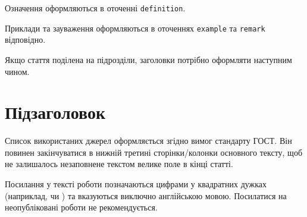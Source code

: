 \documentclass{KnuBulletin}
\begin{document}
\begin{multicols}{2}
    \begin{definition}
	   	Означення оформляються в оточенні \texttt{definition}.
	\end{definition}	
    

	\begin{remark}
		Приклади та зауваження оформляються в оточеннях 
		\texttt{example} та \texttt{remark} відповідно.
	\end{remark}
	
	Якщо стаття поділена на підрозділи, заголовки потрібно оформляти наступним чином. 
	\section*{Підзаголовок}

	Список використаних джерел оформляється згідно вимог стандарту ГОСТ. 
	Він повинен закінчуватися в нижній третині сторінки/колонки основного тексту, щоб не залишалось незаповнене текстом велике поле в кінці статті. 
	
	Посилання у тексті роботи позначаються цифрами у квадратних дужках (наприклад, \cite{takacs1962} чи \cite{klimov1966}) та вказуються 
	виключно англійською мовою. 
	Посилатися на неопубліковані роботи не рекомендується. 


    
    

\end{multicols}
\end{document}
